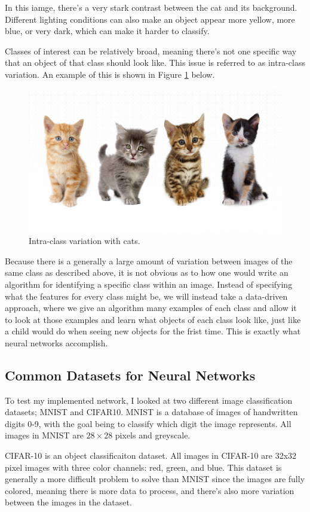 \noindent In this iamge, there's a very stark contrast between the cat and its
background.  Different lighting conditions can also make an object appear more
yellow, more blue, or very dark, which can make it harder to classify.

\noindent Classes of interest can be relatively broad, meaning there's not one
specific way that an object of that class should look like.  This issue is
referred to as intra-class variation. An example of this is shown in Figure
\ref{fig:intra_class_variation} below.

\begin{figure}[ht!] \centering
\includegraphics[height=2.5in]{../figures/kitty_intra_class_variation.jpg}
\caption{Intra-class variation with cats.} \label{fig:intra_class_variation}
\end{figure}

\noindent Because there is a generally a large amount of variation between
images of the same class as described above, it is not obvious as to how one
would write an algorithm for identifying a specific class within an image.
Instead of specifying what the features for every class might be, we will
instead take a data-driven approach, where we give an algorithm many examples
of each class and allow it to look at those examples and learn what objects of
each class look like, just like a child would do when seeing new objects for
the frist time. This is exactly what neural networks accomplish.

\subsection{Common Datasets for Neural Networks}
To test my implemented network, I looked at two different image classification
datasets; MNIST and CIFAR10. MNIST is a database of images of handwritten
digits 0-9, with the goal being to classify which digit the image represents.
All images in MNIST are $28\times28$ pixels and greyscale.

CIFAR-10 is an object classificaiton dataset. All images in CIFAR-10 are 32x32
pixel images with three color channels: red, green, and blue. This dataset is
generally a more difficult problem to solve than MNIST since the images are
fully colored, meaning there is more data to process, and there's also more
variation between the images in the dataset.
